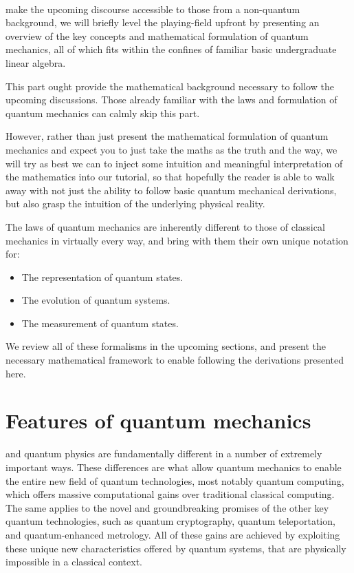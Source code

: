 \\

 make the upcoming discourse accessible to those from a non-quantum background, we will briefly level the playing-field upfront by presenting an overview of the key concepts and mathematical formulation of quantum mechanics, all of which fits within the confines of familiar basic undergraduate linear algebra.

This part ought provide the mathematical background necessary to follow the upcoming discussions. Those already familiar with the laws and formulation of quantum mechanics can calmly skip this part.

However, rather than just present the mathematical formulation of quantum mechanics and expect you to just take the maths as the truth and the way, we will try as best we can to inject some intuition and meaningful interpretation of the mathematics into our tutorial, so that hopefully the reader is able to walk away with not just the ability to follow basic quantum mechanical derivations, but also grasp the intuition of the underlying physical reality.

The laws of quantum mechanics are inherently different to those of classical mechanics in virtually every way, and bring with them their own unique notation for:
\begin{itemize}
	\item The representation of quantum states.
	\item The evolution of quantum systems.
	\item The measurement of quantum states.
\end{itemize}
We review all of these formalisms in the upcoming sections, and present the necessary mathematical framework to enable following the derivations presented here.

%
%

\section{Features of quantum mechanics}

 and quantum physics are fundamentally different in a number of extremely important ways. These differences are what allow quantum mechanics to enable the entire new field of quantum technologies, most notably quantum computing, which offers massive computational gains over traditional classical computing. The same applies to the novel and groundbreaking promises of the other key quantum technologies, such as quantum cryptography, quantum teleportation, and quantum-enhanced metrology. All of these gains are achieved by exploiting these unique new characteristics offered by quantum systems, that are physically impossible in a classical context.


